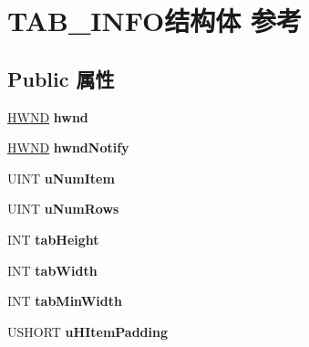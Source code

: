 \hypertarget{struct_t_a_b___i_n_f_o}{}\section{T\+A\+B\+\_\+\+I\+N\+F\+O结构体 参考}
\label{struct_t_a_b___i_n_f_o}
\subsection*{Public 属性}
\begin{DoxyCompactItemize}
\item 
\mbox{\label{struct_t_a_b___i_n_f_o_ab986228d83b39c29f7d3926e139a0744}} 
\hyperlink{interfacevoid}{H\+W\+ND} {\bfseries hwnd}
\item 
\mbox{\label{struct_t_a_b___i_n_f_o_aedd0453779c0ddf1cb8c5d91a6aabc59}} 
\hyperlink{interfacevoid}{H\+W\+ND} {\bfseries hwnd\+Notify}
\item 
\mbox{\label{struct_t_a_b___i_n_f_o_ad08c17da6311230b375ada1415c9de78}} 
U\+I\+NT {\bfseries u\+Num\+Item}
\item 
\mbox{\label{struct_t_a_b___i_n_f_o_ab980be41260bf25d39a1ba786c3e2ba9}} 
U\+I\+NT {\bfseries u\+Num\+Rows}
\item 
\mbox{\label{struct_t_a_b___i_n_f_o_ad35a77adc3e07bdf70bdf6c80808b2d8}} 
I\+NT {\bfseries tab\+Height}
\item 
\mbox{\label{struct_t_a_b___i_n_f_o_a493e1ae25ee5902173c46c648d300061}} 
I\+NT {\bfseries tab\+Width}
\item 
\mbox{\label{struct_t_a_b___i_n_f_o_a28f714fd0dd4d5ec4efd8323ef8d9a54}} 
I\+NT {\bfseries tab\+Min\+Width}
\item 
\mbox{\label{struct_t_a_b___i_n_f_o_a5e4d78146b1822f1c4261594035d6792}} 
U\+S\+H\+O\+RT {\bfseries u\+H\+Item\+Padding}
\item 
\mbox{\label{struct_t_a_b___i_n_f_o_a252edfdc462ee5a7fb35c344dc80711e}} 

\end{DoxyCompactItemize}
